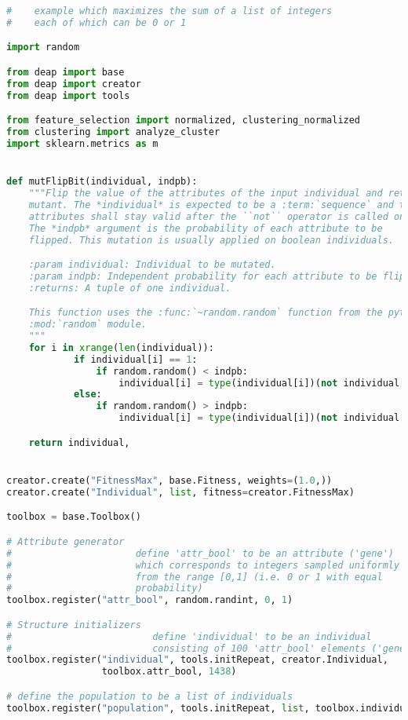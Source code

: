 \begin{lstlisting}[columns=fullflexible,language=Python]
#    example which maximizes the sum of a list of integers
#    each of which can be 0 or 1

import random

from deap import base
from deap import creator
from deap import tools

from feature_selection import normalized, clustering_normalized
from clustering import analyze_cluster
import sklearn.metrics as m


def mutFlipBit(individual, indpb):
    """Flip the value of the attributes of the input individual and return the
    mutant. The *individual* is expected to be a :term:`sequence` and the values of the
    attributes shall stay valid after the ``not`` operator is called on them.
    The *indpb* argument is the probability of each attribute to be
    flipped. This mutation is usually applied on boolean individuals.

    :param individual: Individual to be mutated.
    :param indpb: Independent probability for each attribute to be flipped.
    :returns: A tuple of one individual.

    This function uses the :func:`~random.random` function from the python base
    :mod:`random` module.
    """
    for i in xrange(len(individual)):
            if individual[i] == 1:
                if random.random() < indpb:
                    individual[i] = type(individual[i])(not individual[i])
            else:
                if random.random() > indpb:
                    individual[i] = type(individual[i])(not individual[i])

    return individual,


creator.create("FitnessMax", base.Fitness, weights=(1.0,))
creator.create("Individual", list, fitness=creator.FitnessMax)

toolbox = base.Toolbox()

# Attribute generator
#                      define 'attr_bool' to be an attribute ('gene')
#                      which corresponds to integers sampled uniformly
#                      from the range [0,1] (i.e. 0 or 1 with equal
#                      probability)
toolbox.register("attr_bool", random.randint, 0, 1)

# Structure initializers
#                         define 'individual' to be an individual
#                         consisting of 100 'attr_bool' elements ('genes')
toolbox.register("individual", tools.initRepeat, creator.Individual,
                 toolbox.attr_bool, 1438)

# define the population to be a list of individuals
toolbox.register("population", tools.initRepeat, list, toolbox.individual)



\end{lstlisting}
